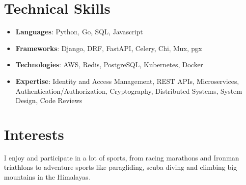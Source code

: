 \documentclass[letterpaper,10pt]{article}
\newcommand{\resumeSubHeadingListStart}{\begin{itemize}[leftmargin=*]}
\newcommand{\resumeSubHeadingListEnd}{\end{itemize}}
\begin{document}
\section{Technical Skills}
 \resumeSubHeadingListStart
   \item \textbf{Languages}{: Python, Go, SQL, Javascript}
   \item \textbf{Frameworks}{: Django, DRF, FastAPI, Celery, Chi, Mux, pgx}
   \item \textbf{Technologies}{: AWS, Redis, PostgreSQL, Kubernetes, Docker}
   \item \textbf{Expertise}{: Identity and Access Management, REST APIs, Microservices, Authentication/Authorization, Cryptography, Distributed Systems, System Design, Code Reviews}
 \resumeSubHeadingListEnd

\section{Interests}
    I enjoy and participate in a lot of sports, from racing marathons and Ironman triathlons to adventure sports like paragliding, scuba diving and climbing big mountains in the Himalayas.
\end{document}
